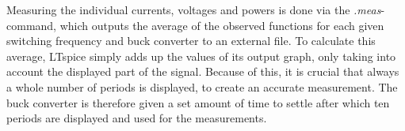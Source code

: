 Measuring the individual currents, voltages and powers is done via the \textit{.meas}-command, which outputs the average of the observed functions for each given switching frequency and buck converter to an external file. To calculate this average, LTspice simply adds up the values of its output graph, only taking into account the displayed part of the signal. Because of this, it is crucial that always a whole number of periods is displayed, to create an accurate measurement. The buck converter is therefore given a set amount of time to settle after which ten periods are displayed and used for the measurements. 






